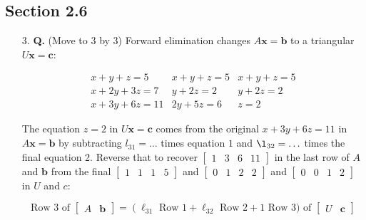 \documentclass[main.tex]{subfiles}
\begin{document}
\subsection{Section 2.6}
\begin{enumerate}
    \item [3.] \textbf{Q.} (Move to 3 by 3) Forward elimination changes $A\bm{x}=\bm{b}$ to a triangular $U\bm{x}=\bm{c}$:
    
    $$
    \begin{array}{lrr}x+y+z=5 & x+y+z=5 & x+y+z=5 \\ x+2 y+3 z=7 & y+2 z=2 & y+2 z=2 \\ x+3 y+6 z=11 & 2 y+5 z=6 & z=2\end{array}
    $$
    
    The equation $z=2$ in $U \bm{x}=\bm{c}$ comes from the original $x+3 y+6 z=11$ in $A \bm{x}=\bm{b}$ by subtracting $l_{31}= \dots$ times equation $1$ and $\l_{32}=\ldots$ times the final equation 2. Reverse that to recover $\left[\begin{array}{llll}1 & 3 & 6 & 11\end{array}\right]$ in the last row of $A$ and $\bm{b}$ from the final $\left[\begin{array}{llll}1 & 1 & 1 & 5\end{array}\right]$ and $\left[\begin{array}{llll}0 & 1 & 2 & 2\end{array}\right]$ and $\left[\begin{array}{llll}0 & 0 & 1 & 2\end{array}\right]$ in $U$ and $c$:
    
    $$
    \text{Row 3 of } \left[\begin{array}{ll}A & \bm{b} \end{array}\right]=\left(\ell_{31}\right. \text{ Row } 1+\ell_{32} \text{ Row } 2+1 \text{ Row } 3) 
    \text{ of } \left[\begin{array}{ll}U & \bm{c}\end{array}\right]
    $$
    

\end{enumerate}
\end{document}
